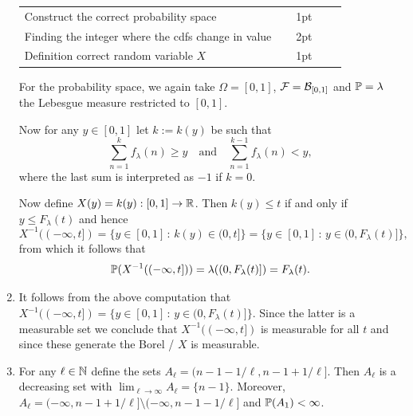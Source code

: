 \begin{enumerate}[label=(\alph*)]
{\begin{tabular}{p{0.8\linewidth}p{0.15\linewidth}}
\hline
Construct the correct probability space & 1pt\\
Finding the integer where the cdfs change in value & 2pt\\
Definition correct random variable $X$ & 1pt\\
\hline
\end{tabular}

}
For the probability space, we again take $\Omega = [0,1]$, $\cF = \cB_{[0,1]}$ and $\bbP = \lambda$ the Lebesgue measure restricted to $[0,1]$. 

Now for any $y \in [0,1]$ let $k := k(y)$ be such that
\[
	\sum_{n = 1}^k f_\lambda(n) \ge y \quad \text{and} \quad \sum_{n = 1}^{k-1} f_\lambda(n) < y,
\]
where the last sum is interpreted as $-1$ if $k=0$.

Now define $X(y) = k(y) : [0,1] \to \bbR$. Then $k(y) \le t$ if and only if $y \le F_\lambda(t)$ and hence
\[
	X^{-1}((-\infty,t]) = \{y \in [0,1] \, : \, k(y) \in (0,t]\}
	= \{y \in [0,1] \, : \, y \in (0, F_\lambda(t)]\},
\]
from which it follows that
\[
	\bbP(X^{-1}((-\infty,t])) = \lambda((0, F_\lambda(t)]) = F_\lambda(t).
\]
\item {}
It follows from the above computation that $X^{-1}((-\infty,t]) = \{y \in [0,1] \, : \, y \in (0, F_\lambda(t)]\}$. Since the latter is a measurable set we conclude that $X^{-1}((-\infty,t])$ is measurable for all $t$ and since these generate the Borel \sigalg/ $X$ is measurable.
\item {}

For any $\ell \in \mathbb N$ define the sets $A_\ell = (n-1-1/\ell, n-1 + 1/\ell]$. Then $A_\ell$ is a decreasing set with $\lim_{\ell \to \infty} A_\ell = \{n-1\}$. Moreover, $A_\ell = (-\infty,n-1+1/\ell] \setminus (-\infty, n-1-1/\ell]$ and $\mathbb P(A_1) < \infty$. 


\end{enumerate}
